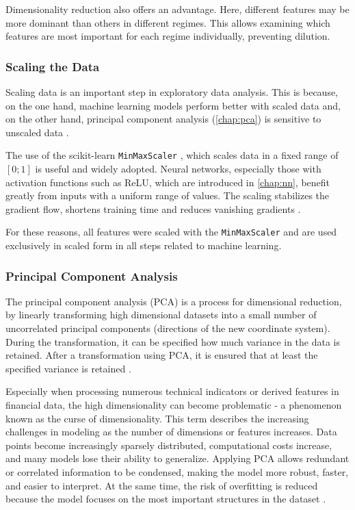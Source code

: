 Dimensionality reduction also offers an advantage.
Here, different features may be more dominant than others in different regimes.
This allows examining which features are most important for each regime individually, preventing dilution.

\subsubsection{Scaling the Data}

Scaling data is an important step in exploratory data analysis.
This is because, on the one hand, machine learning models perform better with scaled data \cite{data-scaling} and, on the other hand, principal component analysis (\autoref{chap:pca}) is sensitive to unscaled data \cite{pca-scaling}.

The use of the scikit-learn \texttt{MinMaxScaler} \cite{min-max}, which scales data in a fixed range of $[0; 1]$ is useful and widely adopted.
Neural networks, especially those with activation functions such as ReLU, which are introduced in \autoref{chap:nn}, benefit greatly from inputs with a uniform range of values.
The scaling stabilizes the gradient flow, shortens training time and reduces vanishing gradients \cite{min-max-benefits}.

For these reasons, all features were scaled with the \texttt{MinMaxScaler} and are used exclusively in scaled form in all steps related to machine learning.

\subsubsection{Principal Component Analysis}
\label{chap:pca}

The principal component analysis (PCA) is a process for dimensional reduction, by linearly transforming high dimensional datasets into a small number of uncorrelated principal components  (directions of the new coordinate system).
During the transformation, it can be specified how much variance in the data is retained.
After a transformation using PCA, it is ensured that at least the specified variance is retained \cite{wikipedia-pca}.

Especially when processing numerous technical indicators or derived features in financial data, the high dimensionality can become problematic - a phenomenon known as the curse of dimensionality.
This term describes the increasing challenges in modeling as the number of dimensions or features increases.
Data points become increasingly sparsely distributed, computational costs increase, and many models lose their ability to generalize.
Applying PCA allows redundant or correlated information to be condensed, making the model more robust, faster, and easier to interpret.
At the same time, the risk of overfitting is reduced because the model focuses on the most important structures in the dataset \cite{wikipedia-curse-od-dimensionality}.

